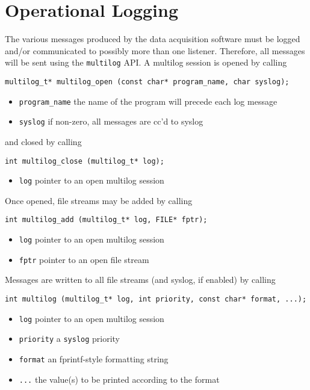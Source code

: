 \chapter{Operational Logging}

The various messages produced by the data acquisition software must be
logged and/or communicated to possibly more than one listener.  Therefore,
all messages will be sent using the {\tt multilog} API.  A multilog session
is opened by calling
\begin{verbatim}
multilog_t* multilog_open (const char* program_name, char syslog);
\end{verbatim}
\vspace{-6mm}
\begin{itemize}
\item {\tt program\_name} the name of the program will precede each log message
\vspace{-2mm}
\item {\tt syslog} if non-zero, all messages are cc'd to syslog
\end{itemize}
and closed by calling
\begin{verbatim}
int multilog_close (multilog_t* log);
\end{verbatim}
\vspace{-6mm}
\begin{itemize}
\item {\tt log} pointer to an open multilog session
\end{itemize}
Once opened, file streams may be added by calling
\begin{verbatim}
int multilog_add (multilog_t* log, FILE* fptr);
\end{verbatim}
\vspace{-6mm}
\begin{itemize}
\item {\tt log} pointer to an open multilog session
\vspace{-2mm}
\item {\tt fptr} pointer to an open file stream
\end{itemize}
Messages are written to all file streams (and syslog, if enabled) by calling
\begin{verbatim}
int multilog (multilog_t* log, int priority, const char* format, ...);
\end{verbatim}
\vspace{-6mm}
\begin{itemize}
\item {\tt log} pointer to an open multilog session
\vspace{-2mm}
\item {\tt priority} a {\tt syslog} priority
\vspace{-2mm}
\item {\tt format} an fprintf-style formatting string
\vspace{-2mm}
\item {\tt ...} the value(s) to be printed according to the format
\end{itemize}

